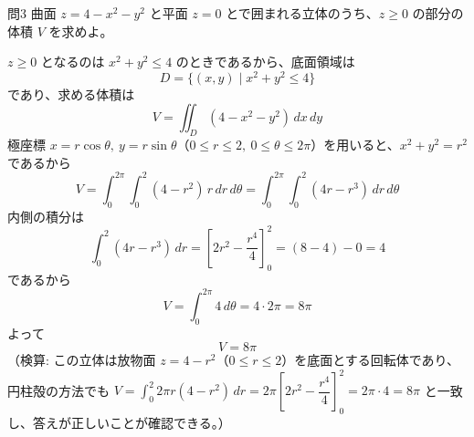 \documentclass[a4paper,11pt]{article}
\begin{document}
\clearpage
\begin{mondaiboxS}{問3}
曲面 $z = 4 - x^{2} - y^{2}$ と平面 $z = 0$ とで囲まれる立体のうち、$z \ge 0$ の部分の体積 $V$ を求めよ。
\end{mondaiboxS}
\kaitou
$z \ge 0$ となるのは $x^{2}+y^{2} \le 4$ のときであるから、底面領域は
\[
D = \{(x,y) \mid x^{2}+y^{2} \le 4\}
\]
であり、求める体積は
\[
V = \iint_{D} (4 - x^{2} - y^{2})\,dx\,dy
\]
極座標 $x=r\cos\theta,\ y=r\sin\theta$（$0\le r\le 2,\ 0\le\theta\le 2\pi$）を用いると、$x^2+y^2=r^2$ であるから
\[
V = \int_{0}^{2\pi}\int_{0}^{2} (4 - r^{2})\, r\,dr\,d\theta
= \int_{0}^{2\pi}\int_{0}^{2} (4r - r^{3})\,dr\,d\theta
\]
内側の積分は
\[
\int_{0}^{2} (4r - r^{3})\,dr = \left[2r^{2} - \frac{r^{4}}{4}\right]_{0}^{2} = (8 - 4) - 0 = 4
\]
であるから
\[
V = \int_{0}^{2\pi} 4\,d\theta = 4 \cdot 2\pi = 8\pi
\]
よって
\[
\boxed{\; V = 8\pi \;}
\]
（検算: この立体は放物面 $z=4-r^2$（$0\le r\le2$）を底面とする回転体であり、円柱殻の方法でも
$V = \int_0^2 2\pi r (4-r^2)\,dr = 2\pi\left[2r^2 - \dfrac{r^4}{4}\right]_0^2 = 2\pi\cdot4 = 8\pi$
と一致し、答えが正しいことが確認できる。）
\end{document}
